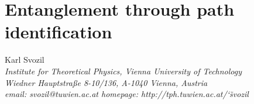 \documentclass{ws-book9x6}
\begin{document}
\titlepages                        %












\chapter[Entanglement through path identification]{Entanglement through path identification}
\begin{center}
{Karl Svozil}\\
{\it Institute for Theoretical Physics, Vienna  University of Technology}\\
{\it  Wiedner Hauptstra\ss e 8-10/136, A-1040  Vienna, Austria}\\
{\it email: {svozil@tuwien.ac.at} homepage: {http://tph.tuwien.ac.at/\char`\~svozil} }
\end{center}

\end{document}
